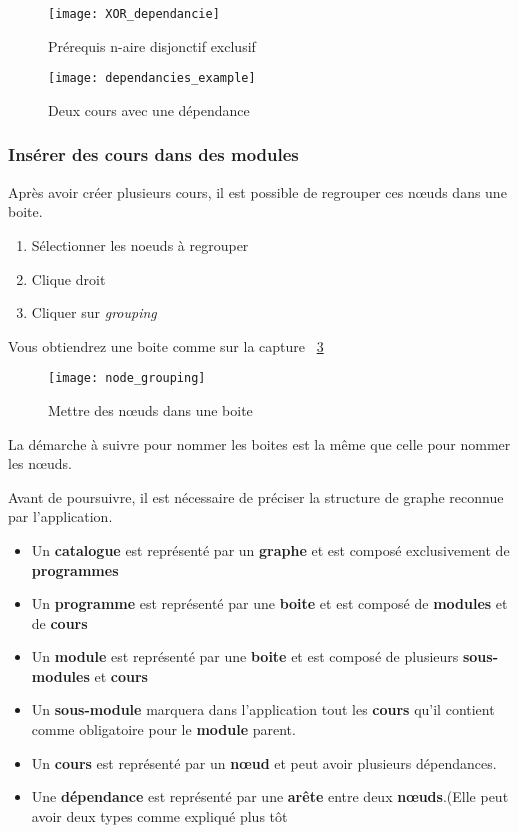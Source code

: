 \begin{figure}[htb]
\centering
\caption{Prérequis n-aire disjonctif exclusif}
\label{fig:xor_depandancy}
\texttt{[image: XOR\_dependancie]}
\end{figure}

\begin{figure}[htb]
\label{fig:dependancies_example}
\centering
\caption{Deux cours avec une dépendance}
\texttt{[image: dependancies\_example]}

\end{figure}

\subsubsection{Insérer des cours dans des modules}
Après avoir créer plusieurs cours, il est possible de regrouper ces nœuds dans une boite.
\begin{enumerate}
\item Sélectionner les noeuds à regrouper
\item Clique droit
\item Cliquer sur \textit{grouping}
\end{enumerate}

Vous obtiendrez une boite comme sur la capture ~\ref{fig:node_grouping}

\begin{figure}[htb]
\centering
\caption{Mettre des nœuds dans une boite}
\label{fig:node_grouping}
\texttt{[image: node\_grouping]}
\end{figure}

La démarche à suivre pour nommer les boites est la même que celle pour nommer les nœuds.

Avant de poursuivre, il est nécessaire de préciser la structure de graphe reconnue par l'application. 

\begin{itemize}
\item Un \textbf{catalogue} est représenté par un \textbf{graphe} et est composé exclusivement de \textbf{programmes}
\item Un \textbf{programme} est représenté par une \textbf{boite} et est composé de \textbf{modules} et de \textbf{cours}
\item Un \textbf{module} est représenté par une \textbf{boite} et est composé de plusieurs \textbf{sous-modules} et \textbf{cours}
\item Un \textbf{sous-module} marquera dans l'application tout les \textbf{cours} qu'il contient comme obligatoire pour le \textbf{module} parent.
\item Un \textbf{cours} est représenté par un \textbf{nœud} et peut avoir plusieurs dépendances. 
\item Une \textbf{dépendance} est représenté par une \textbf{arête} entre deux \textbf{nœuds}.(Elle peut avoir deux types comme expliqué plus tôt
\end{itemize}

